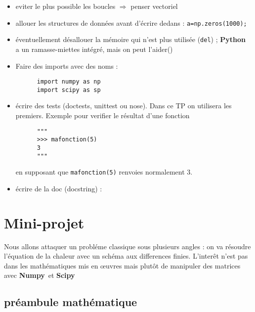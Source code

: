 \documentclass[11pt,a4wide]{article}
\def\mysmile#1{{\ooalign{\hfil\lower.06ex %
 \hbox{$\scriptscriptstyle#1$}\hfil\crcr
 \hfil\lower.7ex\hbox{\"{}}\hfil\crcr
 \mathhexbox20D}}}
\newcommand{\good}{\bf \textcolor{green}{\mysmile \smile}}
\newcommand{\python}{{\bf Python}\ }
\newcommand{\numpy}{{\bf Numpy}\ }
\newcommand{\scipy}{{\bf Scipy}\ }
\begin{document}
\begin{itemize}
\begin{itemize}
      \item eviter le plus possible les boucles $\Rightarrow$ penser vectoriel
      \item allouer les structures de données avant d'écrire dedans : \lstinline!a=np.zeros(1000);!
      \item éventuellement désallouer la mémoire qui n'est plus utilisée ({\tt del}) ; \python 
      a un ramasse-miettes intégré, mais on peut l'aider({\good})
      \item Faire des imports avec des noms : 
      \begin{lstlisting}
      import numpy as np
      import scipy as sp
      \end{lstlisting}
      \item écrire des tests (doctests, unittest ou nose). Dans ce TP on utilisera les premiers. Exemple pour verifier le résultat d'une fonction
      \begin{lstlisting}
      """
      >>> mafonction(5)
      3
      """
      \end{lstlisting}
      en supposant que {\tt mafonction(5)} renvoies normalement 3.

      \item écrire de la doc (docstring) :  

    \end{itemize}

\section{Mini-projet}

   Nous allons attaquer un probléme classique sous plusieurs angles : on va résoudre l'équation de la chaleur avec
   un schéma aux differences finies. L'interêt n'est pas dans les mathématiques mis en \oe uvres mais plutôt
   de manipuler des matrices avec \numpy et \scipy

   \subsection{préambule mathématique}
    

\end{itemize}
\end{document}
